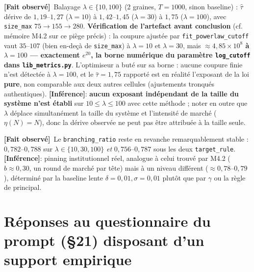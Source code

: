 \documentclass[11pt,a4paper]{article}
\newcommand{\code}[1]{\texttt{#1}}
\newcommand{\fait}{\textbf{[Fait observé]}}
\newcommand{\inference}{\textbf{[Inférence]}}
\begin{document}
\fait\ Balayage $\lambda\in\{10,100\}$ (2 graines, $T=1000$, sinon
baseline) : $\hat\tau$ dérive de $1{,}19$--$1{,}27$ ($\lambda=10$) à
$1{,}42$--$1{,}45$ ($\lambda=30$) à $1{,}75$ ($\lambda=100$), avec
\code{size\_max} $75\to155\to280$. \textbf{Vérification de l'artefact
avant conclusion} (cf. mémoire M4.2 sur ce piège précis) : la coupure
ajustée par \code{fit\_powerlaw\_cutoff} vaut $35$--$107$ (bien en-deçà de
\code{size\_max}) à $\lambda=10$ et $\lambda=30$, mais
\textbf{$\approx4{,}85\times10^{8}$ à $\lambda=100$ --- exactement
$e^{20}$, la borne numérique du paramètre \code{log\_cutoff} dans
\code{lib\_metrics.py}}. L'optimiseur a buté sur sa borne : aucune coupure
finie n'est détectée à $\lambda=100$, et le $\hat\tau=1{,}75$ rapporté est
en réalité l'exposant de la loi \textbf{pure}, non comparable aux deux
autres cellules (ajustements tronqués authentiques). \inference :
\textbf{aucun exposant indépendant de la taille du système n'est établi}
sur $10\le\lambda\le100$ avec cette méthode ; noter en outre que $\lambda$
déplace simultanément la taille du système et l'intensité de marché
($\eta(N)=N$), donc la dérive observée ne peut pas être attribuée à la
taille seule.

\fait\ Le \code{branching\_ratio} reste en revanche remarquablement stable
: $0{,}782$--$0{,}788$ sur $\lambda\in\{10,30,100\}$ \emph{et}
$0{,}756$--$0{,}787$ sous les deux \code{target\_rule}. \inference :
pinning institutionnel réel, analogue à celui trouvé par M4.2
($b\approx0{,}30$, \og un round de marché par tête\fg{}) mais à un niveau
différent ($\approx0{,}78$--$0{,}79$), déterminé par la baseline lente
$\delta{=}0{,}01,\sigma{=}0{,}01$ plutôt que par $\gamma$ ou la règle de
principal.

\section{Réponses au questionnaire du prompt (§21) disposant d'un support
empirique}
\end{document}

